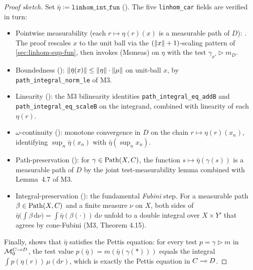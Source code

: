 \begin{proof}[Proof sketch]
Set $\bar\eta := \texttt{linhom\_int\_fun}$
(). The five
\texttt{linhom\_car} fields are verified in turn:
\begin{itemize}
\item Pointwise measurability (each $r \mapsto \eta(r)(x)$ is a
  measurable path of $D$):
  . The proof rescales
  $x$ to the unit ball via the
  $(\lVert x \rVert + 1)$-scaling pattern of
  \autoref{sec:linhom-sup-fun}, then invokes (Msmeas) on $\eta$
  with the test $\gamma_{x'} \triangleright m_D$.
\item Boundedness ():
  $\lVert \bar\eta(x) \rVert \le \lVert \eta \rVert \cdot \lVert \mu \rVert$ on
  unit-ball $x$, by
  \texttt{path\_integral\_norm\_le} of M3.
\item Linearity ():
  the M3 bilinearity identities
  \texttt{path\_integral\_eq\_addB} and
  \texttt{path\_integral\_eq\_scaleB} on the integrand,
  combined with linearity of each $\eta(r)$.
\item $\omega$-continuity
  (): monotone
  convergence in $D$ on the chain $r \mapsto \eta(r)(x_n)$,
  identifying $\sup_n \bar\eta(x_n)$ with $\bar\eta(\sup_n x_n)$.
\item Path-preservation
  (): for
  $\gamma \in \mathrm{Path}(X, C)$, the function $s \mapsto
  \bar\eta(\gamma(s))$ is a measurable path of $D$ by the joint
  test-measurability lemma
   combined with
  Lemma~4.7 of M3.
\item Integral-preservation
  (): the
  fundamental \emph{Fubini} step. For a measurable path
  $\beta \in \mathrm{Path}(X, C)$ and a finite measure $\nu$ on $X$, both
  sides of
  $\bar\eta\bigl(\int \beta\,\mathrm d\nu\bigr) = \int
  \bar\eta(\beta(\cdot))\,\mathrm d\nu$ unfold to a double integral
  over $X \times Y'$ that agrees by cone-Fubini (M3, Theorem 4.15).
\end{itemize}
Finally,  shows that
$\bar\eta$ satisfies the Pettis equation: for every test
$p = \gamma \triangleright m$ in $\mathcal{M}_0^{C \multimap D}$, the test
value $p(\bar\eta) = m(\bar\eta(\gamma(*)))$ equals the integral
$\int p(\eta(r))\,\mu(\mathrm dr)$, which is exactly the Pettis
equation in $C \multimap D$.
\end{proof}

